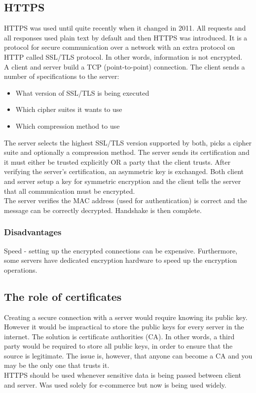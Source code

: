 \documentclass[a4paper]{article}
\theoremstyle{plain}
\theoremstyle{definition}
\theoremstyle{remark}
\begin{document}
\begin{flushleft}
\subsection{HTTPS}
HTTPS was used until quite recently when it changed in 2011. All requests and all responses used plain text by default and then HTTPS was introduced. It is a protocol for secure communication over a network with an extra protocol on HTTP called SSL/TLS protocol. In other words, information is not encrypted. \\
A client and server build a TCP (point-to-point) connection. The client sends a number of specifications to the server:
\begin{itemize}
	\item What version of SSL/TLS is being executed
	\item Which cipher suites it wants to use
	\item Which compression method to use
\end{itemize}
The server selects the highest SSL/TLS version supported by both, picks a cipher suite and optionally a compression method. The server sends its certification and it must either be trusted explicitly OR a party that the client trusts. After verifying the server's certification, an asymmetric key is exchanged. Both client and server setup a key for symmetric encryption and the client tells the server that all communication must be encrypted. \\
The server verifies the MAC address (used for authentication) is correct and the message can be correctly decrypted. Handshake is then complete. 
\subsubsection{Disadvantages}
Speed - setting up the encrypted connections can be expensive. Furthermore, some servers have dedicated encryption hardware to speed up the encryption operations. 
\subsection{The role of certificates}
Creating a secure connection with a server would require knowing its public key. However it would be impractical to store the public keys for every server in the internet. The solution is certificate authorities (CA). In other words, a third party would be required to store all public keys, in order to ensure that the source is legitimate. The issue is, however, that anyone can become a CA and you may be the only one that trusts it. \\
HTTPS should be used whenever sensitive data is being passed between client and server. Was used solely for e-commerce but now is being used widely.

\end{flushleft}
\end{document}
